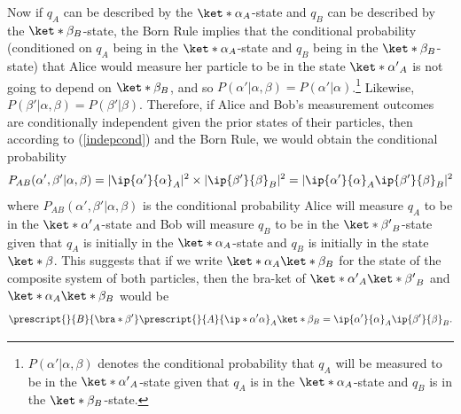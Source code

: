\documentclass[12pt]{report}
\begin{document}
Now if $q_A$ can be described by the $\ket*{\alpha}_A$-state and $q_B$ can be described by the $\ket*{\beta}_B$-state, the Born Rule implies that the conditional probability (conditioned on $q_A$ being in the $\ket*{\alpha}_A$-state and $q_B$ being in the $\ket*{\beta}_B$-state) that Alice would measure her particle to be in the state $\ket*{\alpha'}_A$ is not going to depend on $\ket*{\beta}_B$,  and so  $P(\alpha'|\alpha, \beta)=P(\alpha'|\alpha)$.\footnote{ $P(\alpha'|\alpha, \beta)$ denotes the conditional probability that $q_A$ will be measured to be in the $\ket*{\alpha'}_A$-state given that $q_A$ is in the $\ket*{\alpha}_A$-state and $q_B$ is in the $\ket*{\beta}_B$-state.} Likewise, $P(\beta'|\alpha, \beta)=P(\beta'|\beta)$. 
Therefore, if Alice and Bob's measurement outcomes are conditionally independent given the prior states of their particles, then according to (\ref{indepcond}) and the Born Rule, we would obtain the conditional probability
\begin{equation}\label{indepprob}
    P_{AB}(\alpha', \beta'|\alpha, \beta)=|\ip{\alpha'}{\alpha}_A|^2\times|\ip{\beta'}{\beta}_B|^2=|\ip{\alpha'}{\alpha}_A\ip{\beta'}{\beta}_B|^2
\end{equation}
where $P_{AB}(\alpha', \beta'|\alpha, \beta)$ is the conditional probability Alice will measure $q_A$ to be in the $\ket*{\alpha'}_A$-state and Bob will measure $q_B$ to be in the $\ket*{\beta'}_B$-state given that $q_A$ is initially in the $\ket*{\alpha}_A$-state and $q_B$ is initially in the state $\ket*{\beta}$. %
%
This suggests that if we write $\ket*{\alpha}_A\ket*{\beta}_B$ %
%
for the state of the composite system of both particles, then the bra-ket of $\ket*{\alpha'}_A\ket*{\beta'}_B$ and $\ket*{\alpha}_A\ket*{\beta}_B$ 
would be
\begin{equation}\label{innerprod}
    \prescript{}{B}{ \bra*{\beta'}}\prescript{}{A}{\ip*{\alpha'}{\alpha}}_A\ket*{\beta}_B=\ip{\alpha'}{\alpha}_A\ip{\beta'}{\beta}_B.
\end{equation} %
\end{document}
